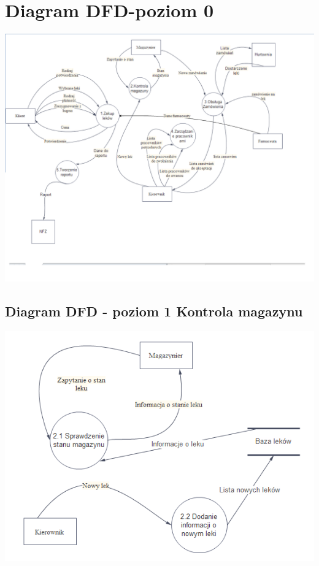 \documentclass[a4paper, 11pt]{article}
\begin{document}
	\section{Diagram DFD-poziom 0}
		\includegraphics[scale=0.7]{dfdpoziom1.PNG} 
	
	\subsection{Diagram DFD - poziom 1 Kontrola magazynu}
		\includegraphics[scale=0.9]{kontrolaMagazynu.PNG} 
		
\end{document}
